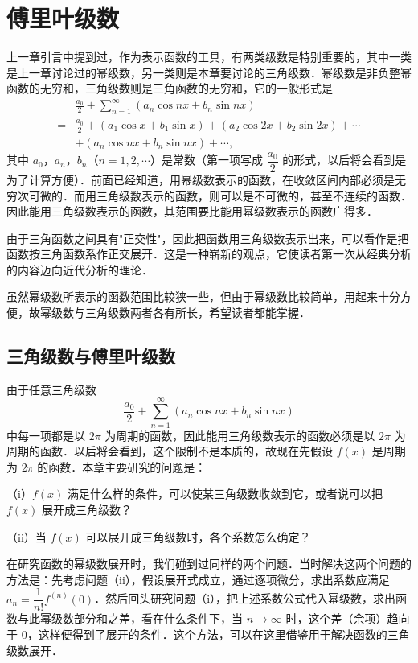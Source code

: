 \chapter{傅里叶级数}

上一章引言中提到过，作为表示函数的工具，有两类级数是特别重要的，其中一类是上一章讨论过的幂级数，另一类则是本章要讨论的三角级数．幂级数是非负整幂函数的无穷和，三角级数则是三角函数的无穷和，它的一般形式是
\[
\begin{aligned}
&\frac{a_{0}}{2}+\sum_{n=1}^{\infty}\left(a_{n}\cos nx+b_{n}\sin nx\right)\\
={}&\frac{a_{0}}{2}+\left(a_{1}\cos x+b_{1}\sin x\right)+\left(a_{2}\cos 2x+b_{2}\sin 2x\right)+\cdots\\
&+\left(a_{n}\cos nx+b_{n}\sin nx\right)+\cdots,
\end{aligned}
\]
其中 $a_{0}$，$a_{n}$，$b_{n}$（$n=1,2,\cdots$）是常数（第一项写成 $\dfrac{a_{0}}{2}$ 的形式，以后将会看到是为了计算方便）．前面已经知道，用幂级数表示的函数，在收敛区间内部必须是无穷次可微的．而用三角级数表示的函数，则可以是不可微的，甚至不连续的函数．因此能用三角级数表示的函数，其范围要比能用幂级数表示的函数广得多．

由于三角函数之间具有"正交性"，因此把函数用三角级数表示出来，可以看作是把函数按三角函数系作正交展开．这是一种崭新的观点，它使读者第一次从经典分析的内容迈向近代分析的理论．

虽然幂级数所表示的函数范围比较狭一些，但由于幂级数比较简单，用起来十分方便，故幂级数与三角级数两者各有所长，希望读者都能掌握．

\section{三角级数与傅里叶级数}

由于任意三角级数
\[
\frac{a_{0}}{2}+\sum_{n=1}^{\infty}\left(a_{n}\cos nx+b_{n}\sin nx\right)
\]
中每一项都是以 $2\pi$ 为周期的函数，因此能用三角级数表示的函数必须是以 $2\pi$ 为周期的函数．以后将会看到，这个限制不是本质的，故现在先假设 $f(x)$ 是周期为 $2\pi$ 的函数．本章主要研究的问题是：

（i）$f(x)$ 满足什么样的条件，可以使某三角级数收敛到它，或者说可以把 $f(x)$ 展开成三角级数？

（ii）当 $f(x)$ 可以展开成三角级数时，各个系数怎么确定？

在研究函数的幂级数展开时，我们碰到过同样的两个问题．当时解决这两个问题的方法是：先考虑问题（ii），假设展开式成立，通过逐项微分，求出系数应满足 $a_{n}=\dfrac{1}{n!}f^{(n)}(0)$．然后回头研究问题（i），把上述系数公式代入幂级数，求出函数与此幂级数部分和之差，看在什么条件下，当 $n\to\infty$ 时，这个差（余项）趋向于 $0$，这样便得到了展开的条件．这个方法，可以在这里借鉴用于解决函数的三角级数展开．

